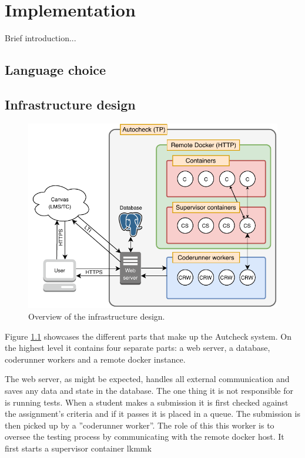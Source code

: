 \chapter{Implementation}

Brief introduction...

\section{Language choice}



\section{Infrastructure design}

\begin{figure}
    \centering
    \includegraphics{figure/Infrastructure.pdf}
    \caption{Overview of the infrastructure design.}
    \label{fig:infrastructure_design}
\end{figure}

Figure \ref{fig:infrastructure_design} showcases the different parts that make up the Autcheck system. On the highest level it contains four separate parts: a web server, a database, coderunner workers and a remote docker instance.

The web server, as might be expected, handles all external communication and saves any data and state in the database. The one thing it is not responsible for is running tests. When a student makes a submission it is first checked against the assignment's criteria and if it passes it is placed in a queue. The submission is then picked up by a ''coderunner worker''. The role of this this worker is to oversee the testing process by communicating with the remote docker host. It first starts a supervisor container lkmmk

